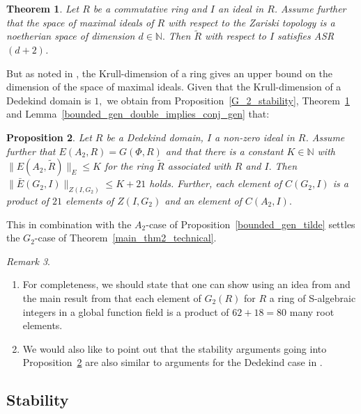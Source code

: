 \documentclass[12pt]{amsart}
\newtheorem{theorem}{Theorem}[section]
\newtheorem{proposition}[theorem]{Proposition}
\theoremstyle{definition}\newtheorem{definition}[theorem]{Definition}
\theoremstyle{remark}\newtheorem{remark}[theorem]{Remark}
\theoremstyle{definition}\newtheorem{case}{Case}
\begin{document}
\begin{theorem}\cite[Theorem~2.3]{ESTES1967343}\cite[Lemma~2.3]{STEIN1971140}\label{absolute_stable_rank}
Let $R$ be a commutative ring and $I$ an ideal in $R$. Assume further that the space of maximal ideals of $R$ with respect to the Zariski topology is a noetherian space of dimension $d\in\mathbb{N}.$ Then $\tilde{R}$ with respect to $I$ satisfies ASR$(d+2)$.
\end{theorem}

But as noted in \cite[P.~102]{MR0249491}, the Krull-dimension of a ring gives an upper bound on the dimension of the space of maximal ideals. Given that the Krull-dimension of a Dedekind domain is $1,$ we obtain from Proposition~\ref{G_2_stability}, Theorem~\ref{absolute_stable_rank} and Lemma~\ref{bounded_gen_double_implies_conj_gen} that:

\begin{proposition}\label{k1_surjective_stability_g2}
Let $R$ be a Dedekind domain, $I$ a non-zero ideal in $R$. Assume further that $E(A_2,R)=G(\Phi,R)$ and that there is a constant $K\in\mathbb{N}$ with $\|E(A_2,\tilde{R})\|_E\leq K$ for the ring $\tilde{R}$ associated with $R$ and $I.$ Then $\|\bar{E}(G_2,I)\|_{Z(I,G_2)}\leq K+21$ holds. Further, each element of $C(G_2,I)$ is a product of $21$ elements of $Z(I,G_2)$ and an element of $C(A_2,I).$
\end{proposition}

This in combination with the $A_2$-case of Proposition~\ref{bounded_gen_tilde} settles the $G_2$-case of Theorem~\ref{main_thm2_technical}.

\begin{remark}
\hfill
\begin{enumerate}
\item For completeness, we should state that one can show using an idea from \cite{MR1044049} and the main result from \cite{https://doi.org/10.1112/blms.12925} that each element of $G_2(R)$ for $R$ a ring of S-algebraic integers in a global function field is a product of $62+18=80$ many root elements.
\item We would also like to point out that the stability arguments going into Proposition~\ref{k1_surjective_stability_g2} are also similar to arguments for the Dedekind case in \cite[Section~5]{kunyavskiui2023bounded}.
\end{enumerate}
\end{remark}

\subsection{Stability}
\end{document}
